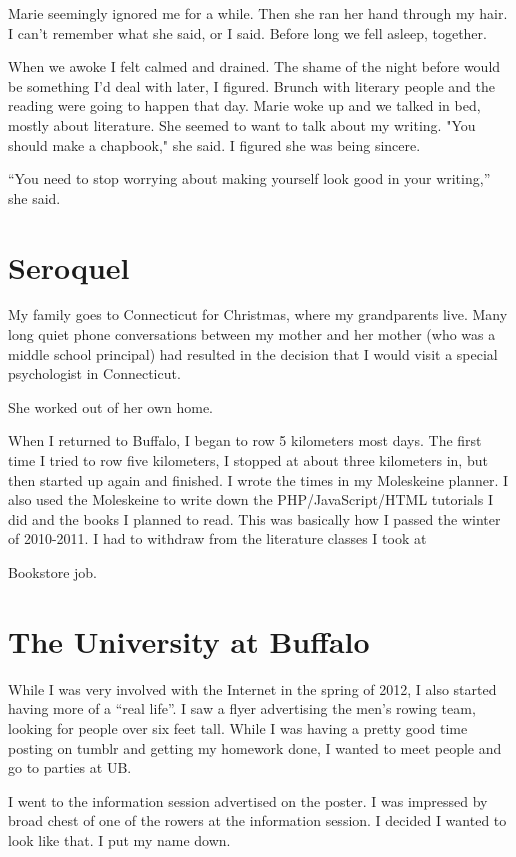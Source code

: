\documentclass[12pt]{article}
\begin{document}
Marie seemingly ignored me for a while. Then she ran her hand through my hair.
I can't remember what she said, or I said.  Before long we fell asleep,
together.

When we awoke I felt calmed and drained.  The shame of the night before would be
something I'd deal with later, I figured.  Brunch with literary people and the
reading were going to happen that day.  Marie woke up and we talked in bed,
mostly about literature.  She seemed to want to talk about my writing.  "You
should make a chapbook," she said.  I figured she was being sincere.  

``You need to stop worrying about making yourself look good in your writing,'' she
said.

\section{Seroquel}
My family goes to Connecticut for Christmas, where my grandparents live.  Many
long quiet phone conversations between my mother and her mother (who was a
middle school principal) had resulted in the decision that I would visit a
special psychologist in Connecticut.

She worked out of her own home.

When I returned to Buffalo, I began to row 5 kilometers most days.  The first
time I tried to row five kilometers, I stopped at about three kilometers in, but
then started up again and finished.  I wrote the times in my Moleskeine planner.
I also used the Moleskeine to write down the PHP/JavaScript/HTML tutorials I did
and the books I planned to read.  This was basically how I passed the winter of
2010-2011.  I had to withdraw from the literature classes I took at 

Bookstore job.

\section{The University at Buffalo}
While I was very involved with the Internet in the spring of 2012, I also
started having more of a ``real life''.  I saw a flyer advertising the men's
rowing team, looking for people over six feet tall.  While I was having a
pretty good time posting on tumblr and getting my homework done, I wanted to
meet people and go to parties at UB. 

I went to the information session advertised on the poster.  I was impressed by
 broad chest of one of the rowers at the information session.  I decided I
wanted to look like that.  I put my name down.
\end{document}
